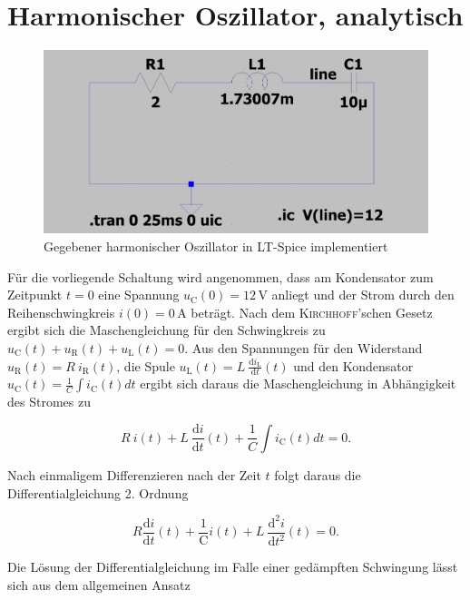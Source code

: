 
	\section{Harmonischer Oszillator, analytisch}\label{sec:ag2.1}
	\begin{figure}[h]
		\centering
		\includegraphics[width=\textwidth]{data/harmOsz}
		\caption{Gegebener harmonischer Oszillator in LT-Spice implementiert}
	\end{figure}
	Für die vorliegende Schaltung wird angenommen, dass am Kondensator zum Zeitpunkt $t = 0$ eine Spannung $u_\mathrm{C}(0) = 12\,$V anliegt und der Strom durch den Reihenschwingkreis $i(0) = 0\,$A beträgt. Nach dem \textsc{Kirchhoff}'schen Gesetz ergibt sich die Maschengleichung für den Schwingkreis zu $u_\mathrm{C}(t) + u_\mathrm{R}(t) + u_\mathrm{L}(t) = 0$. Aus den Spannungen für den Widerstand $u_\mathrm{R}(t) = R \: i_\mathrm{R}(t)$, die Spule $u_\mathrm{L}(t) = L\: \frac{\mathrm{d}i_\mathrm{L}}{\mathrm{d}t}(t)$ und den Kondensator $u_\mathrm{C}(t) = \frac{1}{C} \int i_\mathrm{C}(t)dt $ ergibt sich daraus die Maschengleichung in Abhängigkeit des Stromes zu 
	
	\begin{equation*}
		R\:i(t) + L\: \frac{\mathrm{d}i}{\mathrm{d}t}(t) + \frac{1}{C} \int i_\mathrm{C}(t)dt = 0.
	\end{equation*}
	
	Nach einmaligem Differenzieren nach der Zeit $t$ folgt daraus die Differentialgleichung 2. Ordnung 
	
	\begin{equation}
		R  \frac{\mathrm{d}i}{\mathrm{d}t}(t) + \frac{1}{\mathrm{C}} i(t) +  L\: \frac{\mathrm{d^2}i}{\mathrm{d}t^2}(t) = 0.
		\label{eq:it1}
	\end{equation}
	
	
	
	Die Lösung der Differentialgleichung im Falle einer gedämpften Schwingung lässt sich aus dem allgemeinen Ansatz 
	
